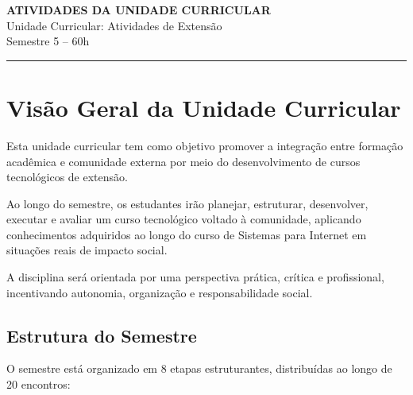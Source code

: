 \documentclass[12pt,a4paper]{article}
\begin{document}
\begin{center}
    {\Large \textbf{ATIVIDADES DA UNIDADE CURRICULAR}}\\
    Unidade Curricular: Atividades de Extensão\\
    Semestre 5 – 60h
\end{center}

\vspace{0.5cm}
\hrule
\vspace{0.8cm}

\tableofcontents
\newpage





\section*{Visão Geral da Unidade Curricular}

Esta unidade curricular tem como objetivo promover a integração entre formação acadêmica e comunidade externa por meio do desenvolvimento de cursos tecnológicos de extensão.

Ao longo do semestre, os estudantes irão planejar, estruturar, desenvolver, executar e avaliar um curso tecnológico voltado à comunidade, aplicando conhecimentos adquiridos ao longo do curso de Sistemas para Internet em situações reais de impacto social.

A disciplina será orientada por uma perspectiva prática, crítica e profissional, incentivando autonomia, organização e responsabilidade social.

\subsection*{Estrutura do Semestre}

O semestre está organizado em 8 etapas estruturantes, distribuídas ao longo de 20 encontros:
\end{document}

